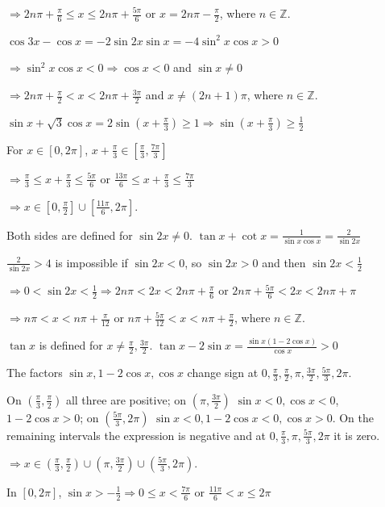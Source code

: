   $\Rightarrow 2n\pi + \frac{\pi}{6}\leq x\leq 2n\pi + \frac{5\pi}{6}$ or $x = 2n\pi - \frac{\pi}{2}$, where
  $n\in\mathbb{Z}$.
\item $\cos3x - \cos x = -2\sin2x\sin x = -4\sin^2x\cos x > 0$

  $\Rightarrow \sin^2x\cos x < 0\Rightarrow \cos x < 0$ and $\sin x\neq 0$

  $\Rightarrow 2n\pi + \frac{\pi}{2} < x < 2n\pi + \frac{3\pi}{2}$ and $x\neq (2n + 1)\pi$, where
  $n\in\mathbb{Z}$.
\item $\sin x + \sqrt{3}\cos x = 2\sin\left(x + \frac{\pi}{3}\right)\geq 1\Rightarrow \sin\left(x +
  \frac{\pi}{3}\right)\geq \frac{1}{2}$

  For $x\in[0, 2\pi]$, $x + \frac{\pi}{3}\in\left[\frac{\pi}{3}, \frac{7\pi}{3}\right]$

  $\Rightarrow \frac{\pi}{3}\leq x + \frac{\pi}{3}\leq \frac{5\pi}{6}$ or $\frac{13\pi}{6}\leq x +
  \frac{\pi}{3}\leq \frac{7\pi}{3}$

  $\Rightarrow x\in\left[0, \frac{\pi}{2}\right]\cup\left[\frac{11\pi}{6}, 2\pi\right]$.
\item Both sides are defined for $\sin2x\neq 0$. $\tan x + \cot x = \frac{1}{\sin x\cos x} = \frac{2}{\sin2x}$

  $\frac{2}{\sin2x} > 4$ is impossible if $\sin2x < 0$, so $\sin2x > 0$ and then $\sin2x < \frac{1}{2}$

  $\Rightarrow 0 < \sin2x < \frac{1}{2}\Rightarrow 2n\pi < 2x < 2n\pi + \frac{\pi}{6}$ or $2n\pi +
  \frac{5\pi}{6} < 2x < 2n\pi + \pi$

  $\Rightarrow n\pi < x < n\pi + \frac{\pi}{12}$ or $n\pi + \frac{5\pi}{12} < x < n\pi + \frac{\pi}{2}$, where
  $n\in\mathbb{Z}$.
\item $\tan x$ is defined for $x\neq \frac{\pi}{2}, \frac{3\pi}{2}$. $\tan x - 2\sin x = \frac{\sin x(1 -
  2\cos x)}{\cos x} > 0$

  The factors $\sin x, 1 - 2\cos x, \cos x$ change sign at $0, \frac{\pi}{3}, \frac{\pi}{2}, \pi,
  \frac{3\pi}{2}, \frac{5\pi}{3}, 2\pi$.

  On $\left(\frac{\pi}{3}, \frac{\pi}{2}\right)$ all three are positive; on $\left(\pi,
  \frac{3\pi}{2}\right)$ $\sin x < 0, \cos x < 0$, $1 - 2\cos x > 0$; on $\left(\frac{5\pi}{3}, 2\pi\right)$
  $\sin x < 0, 1 - 2\cos x < 0, \cos x > 0$. On the remaining intervals the expression is negative and at
  $0, \frac{\pi}{3}, \pi, \frac{5\pi}{3}, 2\pi$ it is zero.

  $\Rightarrow x\in\left(\frac{\pi}{3}, \frac{\pi}{2}\right)\cup\left(\pi,
  \frac{3\pi}{2}\right)\cup\left(\frac{5\pi}{3}, 2\pi\right)$.
\item In $[0, 2\pi]$, $\sin x > -\frac{1}{2}\Rightarrow 0\leq x < \frac{7\pi}{6}$ or $\frac{11\pi}{6} < x\leq
  2\pi$

